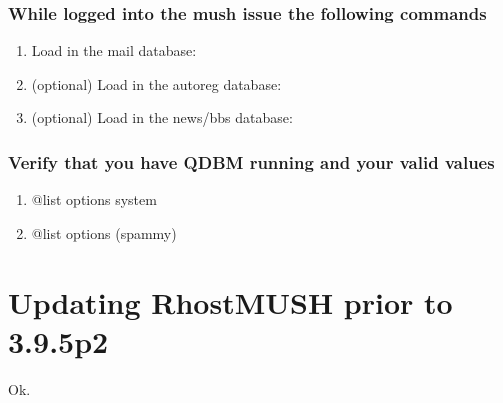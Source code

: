 \documentclass[letterpaper,10pt,english]{sphinxmanual}
\begin{document}
\subsubsection{While logged into the mush issue the following commands}
\label{\detokenize{legacy:while-logged-into-the-mush-issue-the-following-commands}}\begin{enumerate}
%
\item {} 
\sphinxAtStartPar
Load in the mail database:

\begin{sphinxVerbatim}[commandchars=\\\{\}]
\end{sphinxVerbatim}

\item {} 
\sphinxAtStartPar
(optional) Load in the autoreg database:

\begin{sphinxVerbatim}[commandchars=\\\{\}]
\end{sphinxVerbatim}

\item {} 
\sphinxAtStartPar
(optional) Load in the news/bbs database:

\begin{sphinxVerbatim}[commandchars=\\\{\}]
\end{sphinxVerbatim}

\end{enumerate}


\subsubsection{Verify that you have QDBM running and your valid values}
\label{\detokenize{legacy:verify-that-you-have-qdbm-running-and-your-valid-values}}\begin{enumerate}
%
\item {} 
\sphinxAtStartPar
@list options system

\item {} 
\sphinxAtStartPar
@list options (spammy)

\end{enumerate}


\section{Updating RhostMUSH prior to 3.9.5p2}
\label{\detokenize{legacy:updating-rhostmush-prior-to-3-9-5p2}}
\sphinxAtStartPar
Ok.
\end{document}
